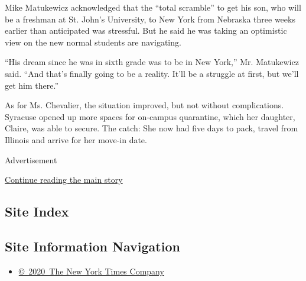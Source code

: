 Mike Matukewicz acknowledged that the ``total scramble'' to get his son,
who will be a freshman at St. John's University, to New York from
Nebraska three weeks earlier than anticipated was stressful. But he said
he was taking an optimistic view on the new normal students are
navigating.

``His dream since he was in sixth grade was to be in New York,'' Mr.
Matukewicz said. ``And that's finally going to be a reality. It'll be a
struggle at first, but we'll get him there.''

As for Ms. Chevalier, the situation improved, but not without
complications. Syracuse opened up more spaces for on-campus quarantine,
which her daughter, Claire, was able to secure. The catch: She now had
five days to pack, travel from Illinois and arrive for her move-in date.

Advertisement

\protect\hyperlink{after-bottom}{Continue reading the main story}

\hypertarget{site-index}{%
\subsection{Site Index}\label{site-index}}

\hypertarget{site-information-navigation}{%
\subsection{Site Information
Navigation}\label{site-information-navigation}}

\begin{itemize}
\tightlist
\item
  \href{https://help.nytimes3xbfgragh.onion/hc/en-us/articles/115014792127-Copyright-notice}{©~2020~The
  New York Times Company}
\end{itemize}

